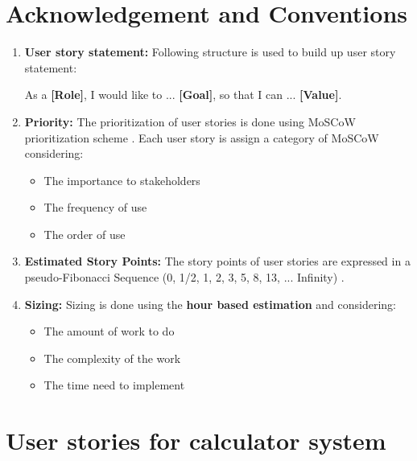 \section{Acknowledgement and Conventions}
\begin{enumerate}
  \item \textbf{User story statement:} Following structure is used to build up user story statement:
  \begin{center}
  As a \textbf{[Role]}, I would like to ... \textbf{[Goal]}, so that I can ... \textbf{ [Value]}.
  \end{center}
  \item \textbf{Priority:} The prioritization of user stories is done using MoSCoW prioritization scheme \cite{wiki_MoSCoW}. Each user story is assign a category of MoSCoW considering:
    \begin{itemize}
  \item The importance to stakeholders
  \item The frequency of use
  \item The order of use
\end{itemize}
\item \textbf{Estimated Story Points:} The story points of user stories are expressed in a pseudo-Fibonacci Sequence (0, 1/2, 1, 2, 3, 5, 8, 13, ... Infinity) \cite{wiki_Fibonacci}.
  \item \textbf{Sizing:} Sizing is done using the\textbf{ hour based estimation} and considering:
  \begin{itemize}
  \item The amount of work to do
  \item The complexity of the work
  \item The time need to implement
\end{itemize}
\end{enumerate}
\section{User stories for calculator system}

